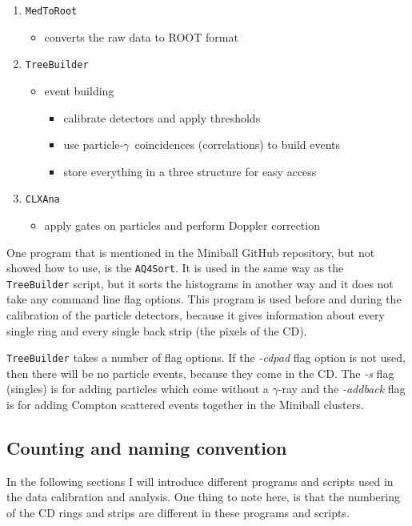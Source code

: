 \documentclass[twoside,english]{uiofysmaster/uiofysmaster}
\newcommand{\ga}{$\gamma$}
\begin{document}
\begin{enumerate}
	\item \texttt{MedToRoot}
	\begin{itemize}
		\item converts the raw data to ROOT format
	\end{itemize}
	\item \texttt{TreeBuilder}
	\begin{itemize}
		\item event building
		\begin{itemize}
			\item calibrate detectors and apply thresholds
			\item use particle-\ga\ coincidences (correlations) to build events
			\item store everything in a three structure for easy access
		\end{itemize}
	\end{itemize}
	\item \texttt{CLXAna}
	\begin{itemize}
		\item apply gates on particles and perform Doppler correction
	\end{itemize}
\end{enumerate}

One program that is mentioned in the Miniball GitHub repository, but not showed how to use, is the \texttt{AQ4Sort}. It is used in the same way as the \texttt{TreeBuilder} script, but it sorts the histograms in another way and it does not take any command line flag options. 
This program is used before and during the calibration of the particle detectors, because it gives information about every single ring and every single back strip (the pixels of the CD). 

\texttt{TreeBuilder} takes a number of flag options. If the \textit{-cdpad} flag option is not used, then there will be no particle events, because they come in the CD. The \textit{-s} flag (singles) is for adding particles which come without a \ga-ray and the \textit{-addback} flag is for adding Compton scattered events together in the Miniball clusters.


\subsection{Counting and naming convention}
In the following sections I will introduce different programs and scripts used in the data calibration and analysis. One thing to note here, is that the numbering of the CD rings and strips are different in these programs and scripts. 
\end{document}
